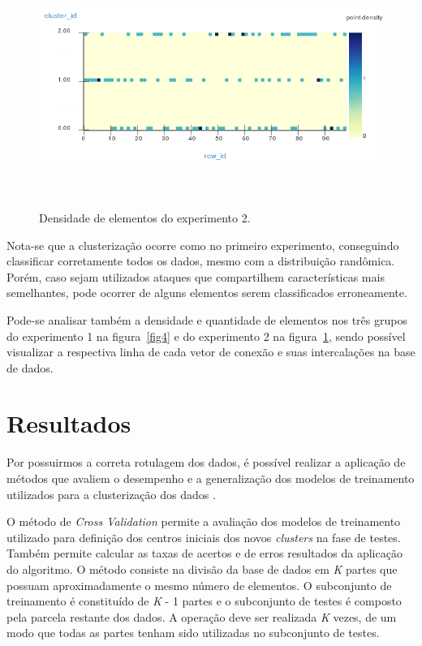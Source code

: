 \begin{figure}[!h]
\centering
\includegraphics[width = 14cm, height = 8cm]{figuras/densidade2.png}
\caption{\scriptsize{Densidade de elementos do experimento 2.}}
\label{fig6}
\end{figure}

\indent Nota-se que a clusterização ocorre como no primeiro experimento, conseguindo classificar corretamente todos os dados, mesmo com a distribuição randômica. Porém, caso sejam utilizados ataques que compartilhem características mais semelhantes, pode ocorrer de alguns elementos serem classificados erroneamente.

\indent Pode-se analisar também a densidade e quantidade de elementos nos três grupos do experimento 1 na figura~\ref{fig4} e do experimento 2 na figura~\ref{fig6}, sendo possível visualizar a respectiva linha de cada vetor de conexão e suas intercalações na base de dados.

    \section{Resultados}

\indent Por possuirmos a correta rotulagem dos dados, é possível realizar a aplicação de métodos que avaliem o desempenho e a generalização dos modelos de treinamento utilizados para a clusterização dos dados \cite{Tan2005}.

\indent O método de \textit{Cross Validation} permite a avaliação dos modelos de treinamento utilizado para definição dos centros iniciais dos novos \textit{clusters} na fase de testes. Também permite calcular as taxas de acertos e de erros resultados da aplicação do algoritmo. O método consiste na divisão da base de dados em \textit{K} partes que possuam aproximadamente o mesmo número de elementos. O subconjunto de treinamento é constituído de \textit{K} - 1 partes e o subconjunto de testes é composto pela parcela restante dos dados. A operação deve ser realizada \textit{K} vezes, de um modo que todas as partes tenham sido utilizadas no subconjunto de testes.

